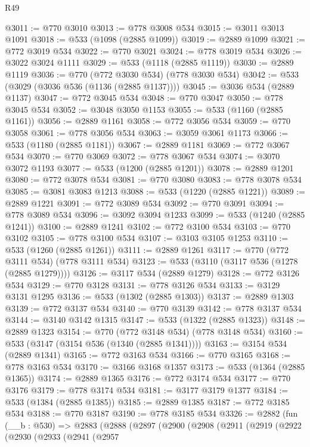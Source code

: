 \begin{lexlean}{R49}
\begin{coremodule}
@3011 := @770 @3010
@3013 := @778 @3008 @534
@3015 := @3011 @3013 @1091
@3018 := @533 (@1098 (@2885 @1099))
@3019 := @2889 @1099
@3021 := @772 @3019 @534
@3022 := @770 @3021
@3024 := @778 @3019 @534
@3026 := @3022 @3024 @1111
@3029 := @533 (@1118 (@2885 @1119))
@3030 := @2889 @1119
@3036 := @770 (@772 @3030 @534) (@778 @3030 @534)
@3042 := @533 (@3029 (@3036 @536 (@1136 (@2885 @1137))))
@3045 := @3036 @534 (@2889 @1137)
@3047 := @772 @3045 @534
@3048 := @770 @3047
@3050 := @778 @3045 @534
@3052 := @3048 @3050 @1153
@3055 := @533 (@1160 (@2885 @1161))
@3056 := @2889 @1161
@3058 := @772 @3056 @534
@3059 := @770 @3058
@3061 := @778 @3056 @534
@3063 := @3059 @3061 @1173
@3066 := @533 (@1180 (@2885 @1181))
@3067 := @2889 @1181
@3069 := @772 @3067 @534
@3070 := @770 @3069
@3072 := @778 @3067 @534
@3074 := @3070 @3072 @1193
@3077 := @533 (@1200 (@2885 @1201))
@3078 := @2889 @1201
@3080 := @772 @3078 @534
@3081 := @770 @3080
@3083 := @778 @3078 @534
@3085 := @3081 @3083 @1213
@3088 := @533 (@1220 (@2885 @1221))
@3089 := @2889 @1221
@3091 := @772 @3089 @534
@3092 := @770 @3091
@3094 := @778 @3089 @534
@3096 := @3092 @3094 @1233
@3099 := @533 (@1240 (@2885 @1241))
@3100 := @2889 @1241
@3102 := @772 @3100 @534
@3103 := @770 @3102
@3105 := @778 @3100 @534
@3107 := @3103 @3105 @1253
@3110 := @533 (@1260 (@2885 @1261))
@3111 := @2889 @1261
@3117 := @770 (@772 @3111 @534) (@778 @3111 @534)
@3123 := @533 (@3110 (@3117 @536 (@1278 (@2885 @1279))))
@3126 := @3117 @534 (@2889 @1279)
@3128 := @772 @3126 @534
@3129 := @770 @3128
@3131 := @778 @3126 @534
@3133 := @3129 @3131 @1295
@3136 := @533 (@1302 (@2885 @1303))
@3137 := @2889 @1303
@3139 := @772 @3137 @534
@3140 := @770 @3139
@3142 := @778 @3137 @534
@3144 := @3140 @3142 @1315
@3147 := @533 (@1322 (@2885 @1323))
@3148 := @2889 @1323
@3154 := @770 (@772 @3148 @534) (@778 @3148 @534)
@3160 := @533 (@3147 (@3154 @536 (@1340 (@2885 @1341))))
@3163 := @3154 @534 (@2889 @1341)
@3165 := @772 @3163 @534
@3166 := @770 @3165
@3168 := @778 @3163 @534
@3170 := @3166 @3168 @1357
@3173 := @533 (@1364 (@2885 @1365))
@3174 := @2889 @1365
@3176 := @772 @3174 @534
@3177 := @770 @3176
@3179 := @778 @3174 @534
@3181 := @3177 @3179 @1377
@3184 := @533 (@1384 (@2885 @1385))
@3185 := @2889 @1385
@3187 := @772 @3185 @534
@3188 := @770 @3187
@3190 := @778 @3185 @534
@3326 := @2882
    (fun (__b : @530) =>
    @2883
      (@2888
        (@2897
          (@2900
            (@2908
              (@2911
                (@2919
                  (@2922
                    (@2930
                      (@2933
                        (@2941
                          (@2957

\end{coremodule}
\end{lexlean}
